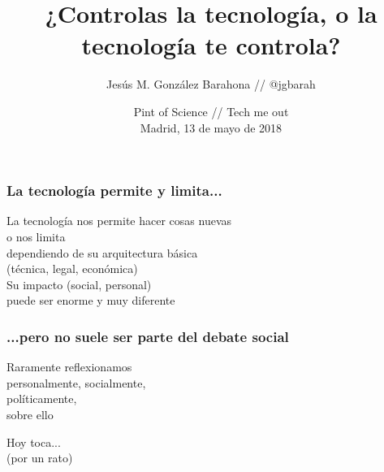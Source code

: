 \documentclass[17pt,aspectratio=169,hyperref=pdfusetitle]{beamer}
\title[¿Controlas la tecnología...?]{¿Controlas la tecnología, o la tecnología te controla?}
\author[Jesús M. González Barahona]{Jesús M. González Barahona //
@jgbarah}
\institute[URJC]{Universidad Rey Juan Carlos \\
}
\date{Pint of Science // Tech me out \\
  Madrid, 13 de mayo de 2018}
\begin{document}
\begin{frame}
  \maketitle
\end{frame}


\begin{frame}
\frametitle{La tecnología permite y limita...}

\begin{flushright}
La tecnología nos permite hacer cosas nuevas \\
o nos limita \\
dependiendo de su arquitectura básica \\
(técnica, legal, económica) \\
\vspace{.2cm}
Su impacto (social, personal) \\
puede ser enorme y muy diferente \\
\end{flushright}

\end{frame}


\begin{frame}
\frametitle{...pero no suele ser parte del debate social}

\begin{center}
{\Large
Raramente reflexionamos\\
personalmente, socialmente, \\
políticamente, \\
sobre ello \\
}
\end{center}

\end{frame}


\begin{frame}

\begin{center}
{\Huge
Hoy toca... \\
(por un rato) \\
}
\end{center}

\end{frame}
\end{document}
